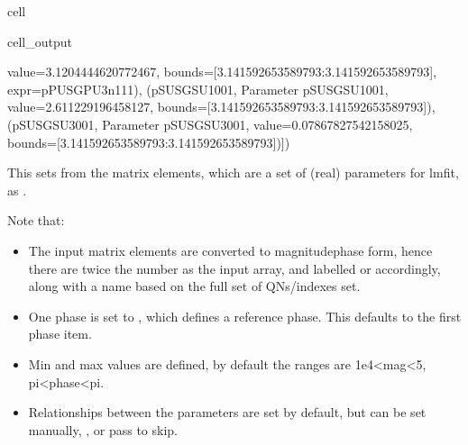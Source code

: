 \documentclass[letterpaper,table,10pt,english]{jupyterBook}
\begin{document}
\begin{sphinxuseclass}{cell}
\begin{sphinxVerbatimOutput}
\begin{sphinxuseclass}{cell_output}
\begin{sphinxVerbatim}[commandchars=\\\{\}]
value=\PYGZhy{}3.1204444620772467, bounds=[\PYGZhy{}3.141592653589793:3.141592653589793], expr=\PYGZsq{}p\PYGZus{}PU\PYGZus{}SG\PYGZus{}PU\PYGZus{}3\PYGZus{}n1\PYGZus{}1\PYGZus{}1\PYGZsq{}\PYGZgt{}), (\PYGZsq{}p\PYGZus{}SU\PYGZus{}SG\PYGZus{}SU\PYGZus{}1\PYGZus{}0\PYGZus{}0\PYGZus{}1\PYGZsq{}, \PYGZlt{}Parameter \PYGZsq{}p\PYGZus{}SU\PYGZus{}SG\PYGZus{}SU\PYGZus{}1\PYGZus{}0\PYGZus{}0\PYGZus{}1\PYGZsq{}, value=2.611229196458127, bounds=[\PYGZhy{}3.141592653589793:3.141592653589793]\PYGZgt{}), (\PYGZsq{}p\PYGZus{}SU\PYGZus{}SG\PYGZus{}SU\PYGZus{}3\PYGZus{}0\PYGZus{}0\PYGZus{}1\PYGZsq{}, \PYGZlt{}Parameter \PYGZsq{}p\PYGZus{}SU\PYGZus{}SG\PYGZus{}SU\PYGZus{}3\PYGZus{}0\PYGZus{}0\PYGZus{}1\PYGZsq{}, value=\PYGZhy{}0.07867827542158025, bounds=[\PYGZhy{}3.141592653589793:3.141592653589793]\PYGZgt{})])
\end{sphinxVerbatim}

\end{sphinxuseclass}\end{sphinxVerbatimOutput}

\end{sphinxuseclass}
\sphinxAtStartPar
This sets  from the matrix elements, which are a set of (real) parameters for lmfit, as .

\sphinxAtStartPar
Note that:
\begin{itemize}
\item {} 
\sphinxAtStartPar
The input matrix elements are converted to magnitude\sphinxhyphen{}phase form, hence there are twice the number as the input array, and labelled  or  accordingly, along with a name based on the full set of QNs/indexes set.

\item {} 
\sphinxAtStartPar
One phase is set to , which defines a reference phase. This defaults to the first phase item.

\item {} 
\sphinxAtStartPar
Min and max values are defined, by default the ranges are 1e\sphinxhyphen{}4<mag<5, \sphinxhyphen{}pi<phase<pi.

\item {} 
\sphinxAtStartPar
Relationships between the parameters are set by default, but can be set manually, , or pass  to skip.

\end{itemize}
\end{document}
